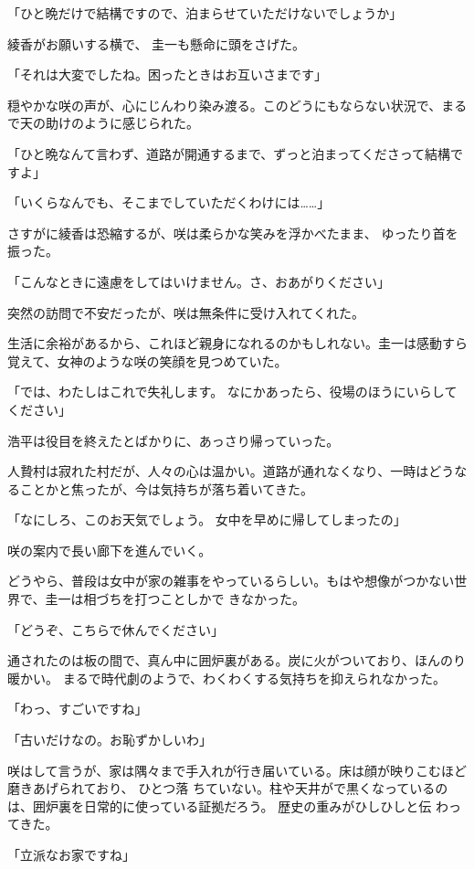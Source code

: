 ﻿\documentclass[
    book,tate,
    line_length=30zw,
    jafontsize=12pt,
    paper=b5j,
    landscape,
    ]{jlreq}
\begin{document}
「ひと晩だけで結構ですので、泊まらせていただけないでしょうか」

綾香がお願いする横で、 圭一も懸命に頭をさげた。

「それは大変でしたね。困ったときはお互いさまです」

穏やかな咲の声が、心にじんわり染み渡る。このどうにもならない状況で、まるで天の助けのように感じられた。

「ひと晩なんて言わず、道路が開通するまで、ずっと泊まってくださって結構ですよ」

「いくらなんでも、そこまでしていただくわけには……」

さすがに綾香は恐縮するが、咲は柔らかな笑みを浮かべたまま、 ゆったり首を振った。

「こんなときに遠慮をしてはいけません。さ、おあがりください」

突然の訪問で不安だったが、咲は無条件に受け入れてくれた。

生活に余裕があるから、これほど親身になれるのかもしれない。圭一は感動すら覚えて、女神のような咲の笑顔を見つめていた。

「では、わたしはこれで失礼します。 なにかあったら、役場のほうにいらしてください」

浩平は役目を終えたとばかりに、あっさり帰っていった。

人贄村は寂れた村だが、人々の心は温かい。道路が通れなくなり、一時はどうなることかと焦ったが、今は気持ちが落ち着いてきた。

「なにしろ、このお天気でしょう。 女中を早めに帰してしまったの」

咲の案内で長い廊下を進んでいく。

どうやら、普段は女中が家の雑事をやっているらしい。もはや想像がつかない世界で、圭一は相づちを打つことしかで きなかった。

「どうぞ、こちらで休んでください」

通されたのは板の間で、真ん中に囲炉裏がある。炭に火がついており、ほんのり暖かい。
まるで時代劇のようで、わくわくする気持ちを抑えられなかった。

「わっ、すごいですね」

「古いだけなの。お恥ずかしいわ」

咲はして言うが、家は隅々まで手入れが行き届いている。床は顔が映りこむほど磨きあげられており、
ひとつ落 ちていない。柱や天井がで黒くなっているのは、囲炉裏を日常的に使っている証拠だろう。
歴史の重みがひしひしと伝 わってきた。

「立派なお家ですね」
\end{document}
